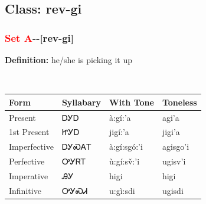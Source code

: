 \subsection*{Class: rev-gi}
\nopagebreak
\needspace{2in}
\subsubsection*{\textcolor{Red}{Set A}{-}\textbf{}{-}[rev-gi]}
\nopagebreak
\textbf{Definition: } he/she is picking it up
\\[0.5em]
\begin{tabularx}{\textwidth}{l X X X}%
\toprule%
\textbf{Form}&\textbf{Syllabary}&\textbf{With Tone}&\textbf{Toneless}\\%
\midrule%
Present&ᎠᎩᎠ&à:gí:’a&agi’a\\%
1st Present&ᏥᎩᎠ&jigí:’a&jigi’a\\%
Imperfective&ᎠᎩᏍᎪᎢ&à:gí:sgó:’i&agisgo’i\\%
Perfective&ᎤᎩᏒᎢ&ù:gí:sv̌:’i&ugisv’i\\%
Imperative&ᎯᎩ&higi&higi\\%
Infinitive&ᎤᎩᏍᏗ&u:gì:sdi&ugisdi\\%
\bottomrule%
\end{tabularx}
\\[1em]